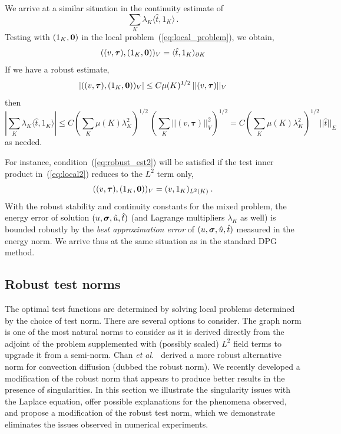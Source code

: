 \documentclass[letterpaper]{article}
\def\bftau{\boldsymbol\tau}
\newcommand{\ptl}{{\partial}}
\newcommand{\bfsig}{\mbox{\boldmath $\sigma$}}
\def\etal{{\it et al.~}}
\begin{document}
We arrive at a similar situation in the continuity estimate of
$$
\sum_K \lambda_K \langle \hat{t}, 1_K \rangle\,.
$$
Testing with $(1_K,{\bf 0})$ in the local problem~(\ref{eq:local_problem}), we obtain,
\begin{equation}
((v,\bftau),(1_K,{\bf 0}))_V = \langle \hat{t}, 1_K \rangle_{\ptl K}
\label{eq:local2}
\end{equation}
If we have a robust estimate,
\begin{equation}
| ((v,\bftau),(1_K,{\bf 0}))_V | \leq C \mu(K)^{1/2} \, || (v,\bftau) ||_V
\label{eq:robust_est2}
\end{equation}
then
\begin{equation}
| \sum_K \lambda_K \langle \hat{t}, 1_K \rangle | \leq C (\sum_K \mu(K) \lambda_K^2)^{1/2}
\, (\sum_K || (v,\bftau) ||_V^2)^{1/2}
= C (\sum_K \mu(K) \lambda_K^2)^{1/2}  || \hat{t} ||_E
\end{equation}
as needed.

For instance, condition~(\ref{eq:robust_est2}) will be satisfied if the test inner product
in~(\ref{eq:local2}) reduces to the $L^2$ term only,
\begin{equation}
((v,\bftau),(1_K,{\bf 0}))_V = (v,1_K)_{L^2(K)} \: .
\end{equation}
With the robust stability and continuity constants for the mixed problem, the energy error
of solution $(u,\bfsig,\hat{u},\hat{t})$ (and Lagrange multipliers $\lambda_K$ as well)
is bounded robustly by the {\em best approximation error} of  $(u,\bfsig,\hat{u},\hat{t})$
measured in the energy norm. We arrive thus at the same situation as in the standard
DPG method.


\subsection{Robust test norms}
The optimal test functions are determined by solving local problems determined
by the choice of test norm. There are several options to consider.
The graph norm \cite{DPGOverview} is one of the most natural norms to consider
as it is derived directly from the adjoint of the problem supplemented with
(possibly scaled) $L^2$ field terms to upgrade it from a semi-norm.
Chan \etal\cite{ChanHeuerThanhDemkowicz2012} derived a more robust alternative
norm for convection diffusion (dubbed the robust norm). We recently
developed a modification of the robust norm that appears to produce better
results in the presence of singularities. In this section we illustrate the
singularity issues with the Laplace equation, offer possible explanations for
the phenomena observed, and propose a modification of the robust test norm,
which we demonstrate eliminates the issues observed in numerical experiments.
\end{document}
